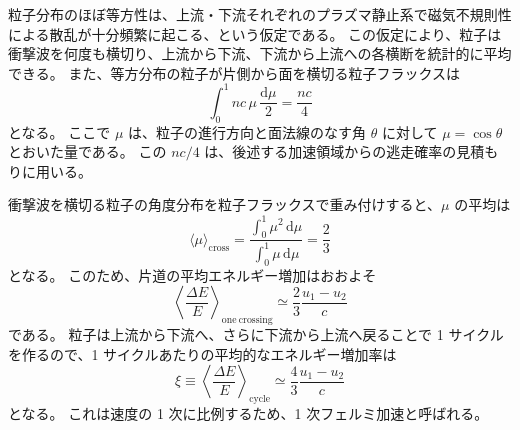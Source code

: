 \documentclass[book,paper=a4,fontsize=11pt]{jlreq}
\begin{document}
粒子分布のほぼ等方性は、上流・下流それぞれのプラズマ静止系で磁気不規則性による散乱が十分頻繁に起こる、という仮定である。
この仮定により、粒子は衝撃波を何度も横切り、上流から下流、下流から上流への各横断を統計的に平均できる。
また、等方分布の粒子が片側から面を横切る粒子フラックスは
\begin{equation}
  \int_0^1 n c\,\mu\,\frac{\mathrm{d}\mu}{2}
  =
  \frac{nc}{4}
\end{equation}
となる。
ここで \(\mu\) は、粒子の進行方向と面法線のなす角 \(\theta\) に対して \(\mu=\cos\theta\) とおいた量である。
この \(nc/4\) は、後述する加速領域からの逃走確率の見積もりに用いる。

衝撃波を横切る粒子の角度分布を粒子フラックスで重み付けすると、\(\mu\) の平均は
\begin{equation}
  \langle\mu\rangle_{\mathrm{cross}}
  =
  \frac{\int_0^1 \mu^2\,\mathrm{d}\mu}
       {\int_0^1 \mu\,\mathrm{d}\mu}
  =
  \frac{2}{3}
\end{equation}
となる。
このため、片道の平均エネルギー増加はおおよそ
\begin{equation}
  \left\langle\frac{\Delta E}{E}\right\rangle_{\mathrm{one\ crossing}}
  \simeq
  \frac{2}{3}\frac{u_1-u_2}{c}
\end{equation}
である。
粒子は上流から下流へ、さらに下流から上流へ戻ることで 1 サイクルを作るので、1 サイクルあたりの平均的なエネルギー増加率は
\begin{equation}
  \xi
  \equiv
  \left\langle\frac{\Delta E}{E}\right\rangle_{\mathrm{cycle}}
  \simeq
  \frac{4}{3}
  \frac{u_1-u_2}{c}
\end{equation}
となる。
これは速度の 1 次に比例するため、1 次フェルミ加速と呼ばれる。
\end{document}
